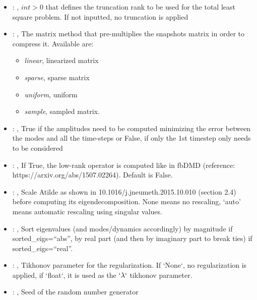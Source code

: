 \begin{itemize}
    \item {}: , 
      $int > 0$ that defines the truncation rank to be used for the total
      least square problem. If not inputted, no truncation is applied

    \item {}: , 
      The matrix method that pre-multiplies the snapshots matrix in order to compress it. Available
      are:                                                   \begin{itemize}
      \item \textit{linear}, linearized matrix
      \item \textit{sparse}, sparse matrix                                                     \item
      \textit{uniform}, uniform                                                     \item
      \textit{sample}, sampled matrix.
      \end{itemize}

    \item {}: , 
      True if the amplitudes need to be computed minimizing the error
      between the modes and all the time-steps or False, if only the 1st timestep only needs to be
      considered

    \item {}: , 
      If True, the low-rank operator is computed like in fbDMD (reference:
      https://arxiv.org/abs/1507.02264).                                                  Default is
      False.

    \item {}: , 
      Scale Atilde as shown in 10.1016/j.jneumeth.2015.10.010 (section 2.4) before computing its
      eigendecomposition. None means no rescaling, ‘auto’ means automatic rescaling using singular
      values.

    \item {}: , 
      Sort eigenvalues (and modes/dynamics accordingly) by magnitude if sorted\_eigs=``abs'',
      by real part (and then by imaginary part to break ties) if sorted\_eigs=``real''.

    \item {}: , 
      Tikhonov parameter for the regularization.                                                  If
      `None`, no regularization is applied, if `float`, it is used as the
      $`\lambda`$ tikhonov parameter.

    \item {}: , 
      Seed of the random number generator
  \end{itemize}

